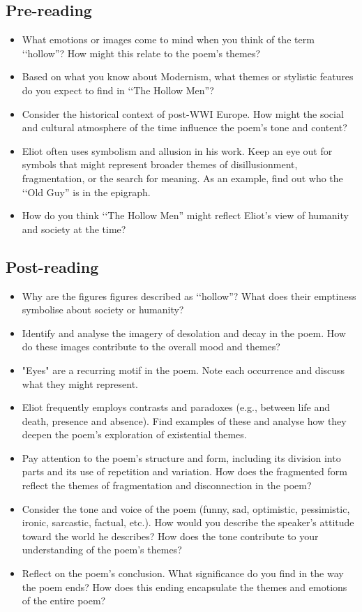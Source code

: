 \documentclass[10pt,a4paper]{article}
\newcommand{\qm}[1]{‘‘#1”}
\begin{document}
\subsection{Pre-reading}
\begin{itemize}
\item What emotions or images come to mind when you think of the term \qm{hollow}? How might this relate to the poem's themes?
\item Based on what you know about Modernism, what themes or stylistic features do you expect to find in \qm{The Hollow Men}?
\item Consider the historical context of post-WWI Europe. How might the social and cultural atmosphere of the time influence the poem's tone and content?
\item Eliot often uses symbolism and allusion in his work. Keep an eye out for symbols that might represent broader themes of disillusionment, fragmentation, or the search for meaning. As an example, find out who the \qm{Old Guy} is in the epigraph.
\item How do you think \qm{The Hollow Men} might reflect Eliot's view of humanity and society at the time?
\end{itemize}

\clearpage

\subsection{Post-reading}
\begin{itemize}
\item Why are the figures figures described as \qm{hollow}? What does their emptiness symbolise about society or humanity?
\item Identify and analyse the imagery of desolation and decay in the poem. How do these images contribute to the overall mood and themes?
\item "Eyes" are a recurring motif in the poem. Note each occurrence and discuss what they might represent.
\item Eliot frequently employs contrasts and paradoxes (e.g., between life and death, presence and absence). Find examples of these and analyse how they deepen the poem's exploration of existential themes.
\item Pay attention to the poem's structure and form, including its division into parts and its use of repetition and variation. How does the fragmented form reflect the themes of fragmentation and disconnection in the poem?
\item Consider the tone and voice of the poem (funny, sad, optimistic, pessimistic, ironic, sarcastic, factual, etc.). How would you describe the speaker's attitude toward the world he describes? How does the tone contribute to your understanding of the poem's themes?
\item Reflect on the poem's conclusion. What significance do you find in the way the poem ends? How does this ending encapsulate the themes and emotions of the entire poem?
\end{itemize}
\end{document}
